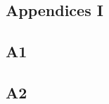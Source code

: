 \appendix

	
\begin{appendices}
\chapter{Appendices I} \label{app:appendix_one}
\section{A1} \label{ase:app_one_sect_1}
\section{A2} \label{ase:app_one_sect_2}
\end{appendices}